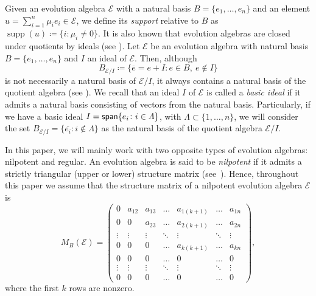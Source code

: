 \documentclass[12pt,reqno]{amsart}
\theoremstyle{plain}%
\theoremstyle{definition}
\theoremstyle{remark}
\newcommand{\E}{\mathcal{E}}
\DeclareMathOperator{\spa}{\textup{\textsf{span}}}
\DeclareMathOperator{\supp}{supp}
\numberwithin{equation}{section}
\begin{document}
Given an evolution algebra $\mathcal{E}$ with a natural basis $B=\{e_1,\dots,e_n\}$ and an element $u=\sum_{i=1}^n\mu_ie_i\in\mathcal{E}$, we define its \textit{support} relative to $B$ as $\supp(u)\coloneqq\{i:\mu_i\neq0\}$. It is also known that evolution algebras are closed under quotients by ideals (see \cite[Lemma~1.4.11]{thesis_yolanda}). Let $\E$ be an evolution algebra with natural basis $B=\{e_1,\dots,e_n\}$ and $I$ an ideal of $\E$. Then, although $$B_{\E/I}\coloneqq\{\overline{e}=e+I\colon e\in B,\ e\notin I\}$$
is not necessarily a natural basis of $\E/I$, it always contains a natural basis of the quotient algebra (see \cite[Remark 1.4.12]{thesis_yolanda}). We recall that an ideal $I$ of $\E$ is called a \emph{basic ideal} if it admits a natural basis
consisting of vectors from the natural basis. Particularly, if we have a basic ideal $I=\spa\{e_i\colon i\in\varLambda\}$, with $\varLambda\subset\{1,\dots,n\}$, we will consider the set $B_{\E/I}=\{\overline{e_i}\colon i\notin\varLambda\}$ as the natural basis of the quotient algebra $\E/I$.

In this paper, we will mainly work with two opposite types of evolution algebras: nilpotent and regular. An evolution algebra is said to be \textit{nilpotent} if it admits a strictly triangular (upper or lower) structure matrix (see~\cite[Theorem~2.7]{CLOR_14}).  Hence, throughout this paper we assume that the structure matrix of a nilpotent evolution algebra $\E$ is 
\begin{equation}\label{eq:matrix}
	M_B(\E)=
	\left(
	\begin{matrix}
		0 & a_{12} & a_{13} & \dots & a_{1(k+1)} & \dots & a_{1n} \\
		0 & 0 & a_{23} & \dots & a_{2(k+1)} & \dots & a_{2n} \\
		\vdots & \vdots & \vdots & \ddots & \vdots & \ddots & \vdots \\
		0 & 0 & 0 & \dots & a_{k(k+1)} & \dots & a_{kn} \\
		0 & 0 & 0 & \dots & 0 & \dots & 0 \\
		\vdots & \vdots & \vdots & \ddots & \vdots & \ddots & \vdots \\
		0 & 0 & 0 & \dots & 0 & \dots & 0
	\end{matrix}
	\right),
\end{equation}
where the first $k$ rows are nonzero.
\end{document}
